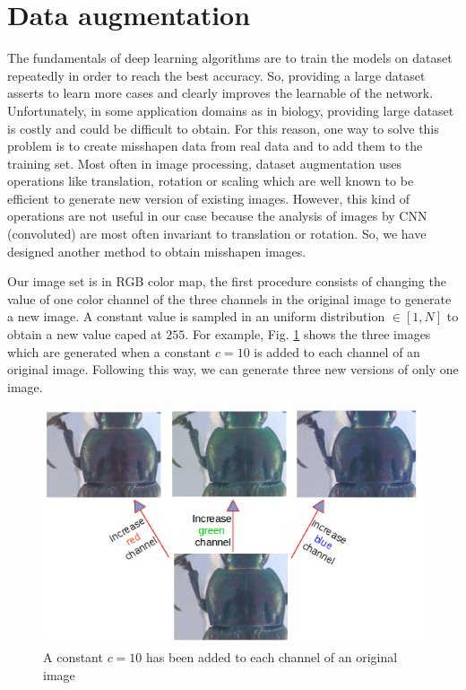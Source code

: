 \documentclass[review]{elsarticle}
\begin{document}
\section{Data augmentation}
\label{Sdataaug}

The fundamentals of deep learning algorithms are to train the models on dataset repeatedly in order to reach the best accuracy. So, providing a large dataset asserts to learn more cases and clearly improves the learnable of the network. Unfortunately, in some application domains as in biology, providing large dataset is costly and could be difficult to obtain. For this reason, one way to solve this problem is to create misshapen data from real data and to add them to the training set. Most often in image processing, dataset augmentation uses operations like translation, rotation or scaling which are well known to be efficient to generate new version of existing images. However, this kind of operations are not useful in our case because the analysis of images by CNN (convoluted) are most often invariant to translation or rotation. So, we have designed another method to obtain misshapen images.

Our image set is in RGB color map, the first procedure consists of changing the value of one color channel of the three channels in the original image to generate a new image. A constant value is sampled in an uniform distribution $\in [1, N]$ to obtain a new value caped at $255$. For example, Fig. \ref{figaug1} shows the three images which are generated  when a constant $c = 10$ is added to each channel of an original image. Following this way, we can generate three new versions of only one image.

\begin{figure}[h]
	\centering
	\includegraphics[scale=0.4]{images/inc_channels}
	\caption{A constant $c = 10$ has been added to each channel of an original image}
	\label{figaug1}
\end{figure}
\end{document}
